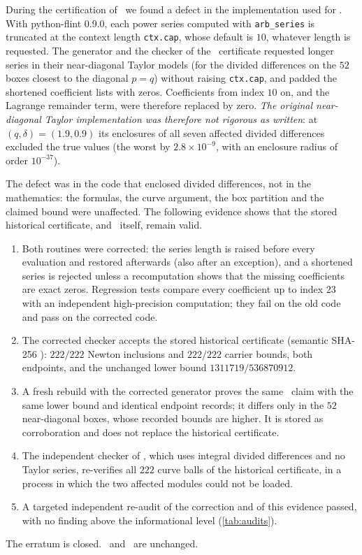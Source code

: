 During the certification of \lemQ\ we found a defect in the implementation used for \lemK. With python-flint 0.9.0, each
power series computed with \texttt{arb\_series} is truncated at the context length \texttt{ctx.cap}, whose default is
$10$, whatever length is requested. The generator and the checker of the \lemK\ certificate requested longer series in
their near-diagonal Taylor models (for the divided differences on the $52$ boxes closest to the diagonal $p=q$) without
raising \texttt{ctx.cap}, and padded the shortened coefficient lists with zeros. Coefficients from index $10$ on, and
the Lagrange remainder term, were therefore replaced by zero. \emph{The original near-diagonal Taylor implementation was
therefore not rigorous as written}: at $(q,\delta)=(1.9,0.9)$ its enclosures of all seven affected divided differences
excluded the true values (the worst by $2.8\times10^{-9}$, with an enclosure radius of order $10^{-37}$).

The defect was in the code that enclosed divided differences, not in the mathematics: the formulas, the curve argument,
the box partition and the claimed bound were unaffected. The following evidence shows that the stored historical
certificate, and \lemK\ itself, remain valid.
\begin{enumerate}[label=(\roman*)]
\item Both routines were corrected: the series length is raised before every evaluation and restored afterwards (also
after an exception), and a shortened series is rejected unless a recomputation shows that the missing coefficients are
exact zeros. Regression tests compare every coefficient up to index $23$ with an independent high-precision computation;
they fail on the old code and pass on the corrected code.
\item The corrected checker accepts the stored historical certificate (semantic SHA-256 ):
$222/222$ Newton inclusions and $222/222$ carrier bounds, both endpoints, and the unchanged lower bound $1311719/536870912$.
\item A fresh rebuild with the corrected generator proves the same \lemK\ claim with the same lower bound and identical
endpoint records; it differs only in the $52$ near-diagonal boxes, whose recorded bounds are higher. It is stored as
corroboration and does not replace the historical certificate.
\item The independent checker of \lemQ, which uses integral divided differences and no Taylor series, re-verifies all
$222$ curve balls of the historical certificate, in a process in which the two affected modules could not be loaded.
\item A targeted independent re-audit of the correction and of this evidence passed, with no finding above the informational level (\cref{tab:audits}).
\end{enumerate}
The erratum is closed. \lemK\ and \propBone\ are unchanged.

